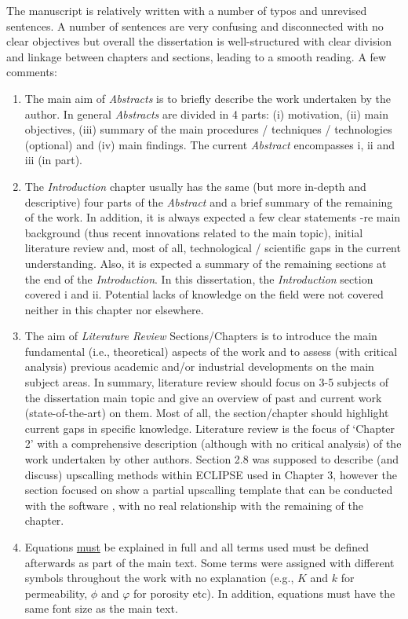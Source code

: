 \documentclass[14pt,twoside]{report}
\begin{document}
The manuscript is relatively written with a number of typos and unrevised sentences. A number of sentences are very confusing and disconnected with no clear objectives but overall the dissertation is well-structured with clear division and linkage between chapters and sections, leading to a smooth reading. A few comments:
\begin{enumerate}
\item The main aim of {\it Abstracts} is to briefly describe the work undertaken by the author. In general {\it Abstracts} are divided in 4 parts: (i) motivation, (ii) main objectives, (iii) summary of the main procedures / techniques / technologies (optional) and (iv) main findings. The current {\it Abstract} encompasses i, ii and iii (in part).
%
\item The {\it Introduction} chapter usually has the same (but more in-depth and descriptive) four parts of the {\it Abstract} and a brief summary of the remaining of the work. In addition, it is always expected a few clear statements -re main background (thus recent innovations related to the main topic), initial literature review and, most of all, technological / scientific gaps in the current understanding. Also, it is expected a summary of the remaining sections at the end of the {\it Introduction}. In this dissertation, the {\it Introduction} section covered i and ii.  Potential lacks of knowledge on the field were not covered neither in this chapter nor elsewhere. 
%
\item The aim of {\it Literature Review} Sections/Chapters is to introduce the main fundamental (i.e., theoretical) aspects of the work and to assess (with critical analysis) previous academic and/or industrial developments on the main subject areas. In summary, literature review should focus on 3-5 subjects of the dissertation main topic and give an overview of past and current work (state-of-the-art) on them. Most of all, the section/chapter should highlight current gaps in specific knowledge. Literature review is the focus of `Chapter 2' with a comprehensive description (although with no critical analysis) of the work undertaken by other authors. Section 2.8 was supposed to describe (and discuss) upscalling methods within ECLIPSE used in Chapter 3, however the section focused on show a partial upscalling template that can be conducted with the software , with no real relationship with the remaining of the chapter.
%
\item Equations \underline{must} be explained in full and all terms used must be defined afterwards as part of the main text. Some terms were assigned with different symbols throughout the work with no explanation (e.g., $K$ and $k$ for permeability, $\phi$ and $\varphi$ for porosity etc). In addition, equations must have the same font size as the main text.

\end{enumerate}
\end{document}
